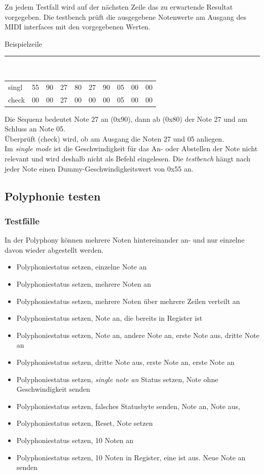 Zu jedem Testfall wird auf der nächsten Zeile das zu erwartende Resultat vorgegeben. Die testbench prüft die ausgegebene Notenwerte am Ausgang des MIDI interfaces mit den vorgegebenen Werten.

Beispielzeile\\
\rule{\textwidth}{0.4pt}\\
{
\renewcommand{\arraystretch}{1.0} %
\begin{tabular*}{\textwidth}{@{}@{\extracolsep{\fill}}*{10}{l}@{}} %
singl & 55 & 90 & 27 & 80 & 27 & 90 & 05 & 00 & 00\\
check & 00 & 00 & 27 & 00 & 00 & 00 & 05 & 00 & 00\\
\end{tabular*}
}

Die Sequenz bedeutet Note 27 an (0x90), dann ab (0x80) der Note 27 und am Schluss an Note 05. \\
Überprüft (check) wird, ob am Ausgang die Noten 27 und 05 anliegen.\\
Im \textit{single mode} ist die Geschwindigkeit für das An- oder Abstellen der Note nicht relevant und wird deshalb nicht als Befehl eingelesen. Die \textit{testbench} hängt nach jeder Note einen Dummy-Geschwindigkeitswert von 0x55 an.

\subsection{Polyphonie testen }\label{polyphonitest}

\subsubsection{Testfälle}

In der Polyphony können mehrere Noten hintereinander an- und nur einzelne davon wieder abgestellt werden.

\begin{itemize}
\item Polyphoniestatus setzen, einzelne Note an
\item Polyphoniestatus setzen, mehrere Noten an
\item Polyphoniestatus setzen, mehrere Noten über mehrere Zeilen verteilt an
\item Polyphoniestatus setzen, Note an, die bereits in Register ist
\item Polyphoniestatus setzen, Note an, andere Note an, erste Note aus, dritte Note an
\item Polyphoniestatus setzen, dritte Note aus, erste Note an, erste Note an
\item Polyphoniestatus setzen, \textit{single note an} Status setzen, Note ohne Geschwindigkeit senden
\item Polyphoniestatus setzen, falsches Statusbyte senden, Note an, Note aus,
\item Polyphoniestatus setzen, Reset, Note setzen
\item Polyphoniestatus setzen, 10 Noten an
\item Polyphoniestatus setzen, 10 Noten in Register, eine ist aus. Neue Note an senden
\end{itemize}

